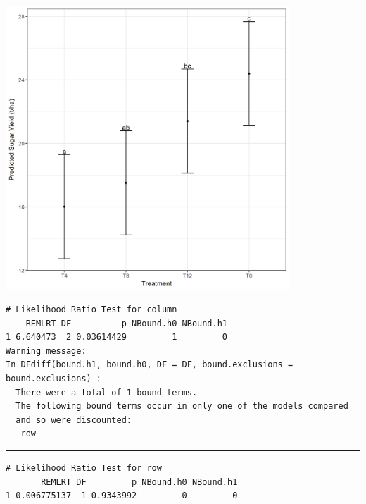 \documentclass[a4paper, 10pt, fleqn, twosided]{memoir}
\begin{document}
\begin{tcolorbox}[title = Exercise 12 output continued]
\includegraphics[width=0.8\textwidth, frame]{Exercise12Pred.png}
\end{tcolorbox}

\begin{tcolorbox}[title = Exercise 12 output]
\begin{verbatim}
# Likelihood Ratio Test for column
    REMLRT DF          p NBound.h0 NBound.h1
1 6.640473  2 0.03614429         1         0
Warning message:
In DFdiff(bound.h1, bound.h0, DF = DF, bound.exclusions = bound.exclusions) :
  There were a total of 1 bound terms.
  The following bound terms occur in only one of the models compared
  and so were discounted:
   row

\end{verbatim}
{\color{outpt} {\hrule height 1pt}}

\begin{verbatim}
# Likelihood Ratio Test for row
       REMLRT DF         p NBound.h0 NBound.h1
1 0.006775137  1 0.9343992         0         0

\end{verbatim}
\end{tcolorbox}
\end{document}
